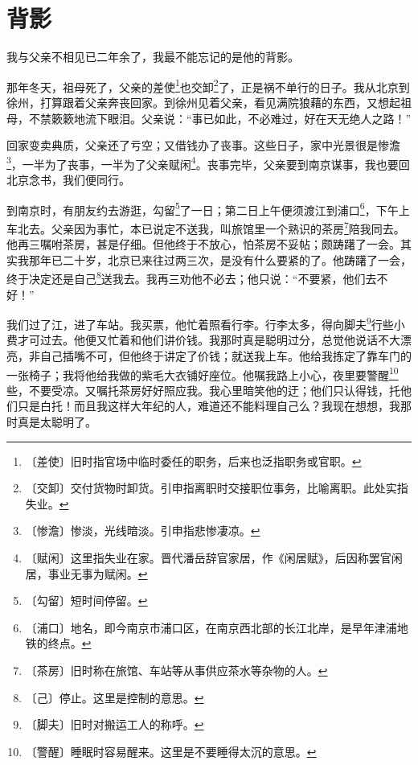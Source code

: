 \documentclass[12pt,UTF-8,openany]{ctexbook}
\begin{document}
\chapter{背影}

\begin{normalsize}
    
    我与父亲不相见已二年余了，我最不能忘记的是他的背影。
    
    那年冬天，祖母死了，父亲的差使\footnote{〔差使〕旧时指官场中临时委任的职务，后来也泛指职务或官职。}也交卸\footnote{〔交卸〕交付货物时卸货。引申指离职时交接职位事务，比喻离职。此处实指失业。}了，正是祸不单行的日子。我从北京到徐州，打算跟着父亲奔丧回家。到徐州见着父亲，看见满院狼藉的东西，又想起祖母，不禁簌簌地流下眼泪。父亲说：“事已如此，不必难过，好在天无绝人之路！”
    
    回家变卖典质，父亲还了亏空；又借钱办了丧事。这些日子，家中光景很是惨澹\footnote{〔惨澹〕惨淡，光线暗淡。引申指悲惨凄凉。}，一半为了丧事，一半为了父亲赋闲\footnote{〔赋闲〕这里指失业在家。晋代潘岳辞官家居，作《闲居赋》，后因称罢官闲居，事业无事为赋闲。}。丧事完毕，父亲要到南京谋事，我也要回北京念书，我们便同行。
    
    到南京时，有朋友约去游逛，勾留\footnote{〔勾留〕短时间停留。}了一日；第二日上午便须渡江到浦口\footnote{〔浦口〕地名，即今南京市浦口区，在南京西北部的长江北岸，是早年津浦地铁的终点。}，下午上车北去。父亲因为事忙，本已说定不送我，叫旅馆里一个熟识的茶房\footnote{〔茶房〕旧时称在旅馆、车站等从事供应茶水等杂物的人。}陪我同去。他再三嘱咐茶房，甚是仔细。但他终于不放心，怕茶房不妥帖；颇踌躇了一会。其实我那年已二十岁，北京已来往过两三次，是没有什么要紧的了。他踌躇了一会，终于决定还是自己\footnote{〔己〕停止。这里是控制的意思。}送我去。我再三劝他不必去；他只说：“不要紧，他们去不好！”
    
    我们过了江，进了车站。我买票，他忙着照看行李。行李太多，得向脚夫\footnote{〔脚夫〕旧时对搬运工人的称呼。}行些小费才可过去。他便又忙着和他们讲价钱。我那时真是聪明过分，总觉他说话不大漂亮，非自己插嘴不可，但他终于讲定了价钱；就送我上车。他给我拣定了靠车门的一张椅子；我将他给我做的紫毛大衣铺好座位。他嘱我路上小心，夜里要警醒\footnote{〔警醒〕睡眠时容易醒来。这里是不要睡得太沉的意思。}些，不要受凉。又嘱托茶房好好照应我。我心里暗笑他的迂；他们只认得钱，托他们只是白托！而且我这样大年纪的人，难道还不能料理自己么？我现在想想，我那时真是太聪明了。
    

\end{normalsize}
\end{document}
